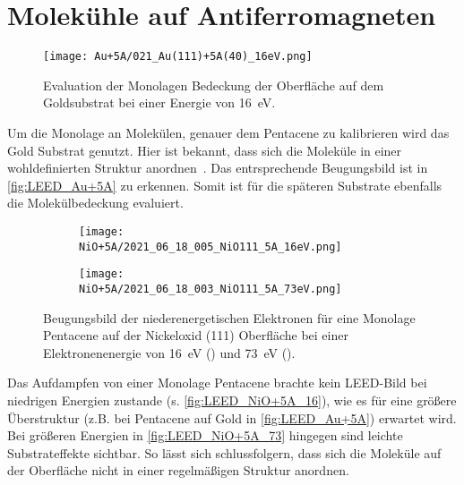     \section{Molekühle auf Antiferromagneten} \label{sec:Ergeb}
        \begin{figure}
            \centering
            \texttt{[image: Au+5A/021\_Au(111)+5A(40)\_16eV.png]}
            \caption{Evaluation der Monolagen Bedeckung der Oberfläche auf dem Goldsubstrat bei einer Energie von \SI{16}{\electronvolt}.}
            \label{fig:LEED_Au+5A}
        \end{figure}
        Um die Monolage an Molekülen, genauer dem Pentacene zu kalibrieren wird das Gold Substrat genutzt.
        Hier ist bekannt, dass sich die Moleküle in einer wohldefinierten Struktur anordnen~\cite{5A_4}.
        Das entrsprechende Beugungsbild ist in \autoref{fig:LEED_Au+5A} zu erkennen.
        Somit ist für die späteren Substrate ebenfalls die Molekülbedeckung evaluiert.

        \begin{figure}
            \centering
            \begin{subfigure}[t]{0.48\textwidth}
                \centering
                \texttt{[image: NiO+5A/2021\_06\_18\_005\_NiO111\_5A\_16eV.png]}
                \subcaption{}
                \label{fig:LEED_NiO+5A_16}
            \end{subfigure}
            \begin{subfigure}[t]{0.48\textwidth}
                \centering
                \texttt{[image: NiO+5A/2021\_06\_18\_003\_NiO111\_5A\_73eV.png]}
                \subcaption{}
                \label{fig:LEED_NiO+5A_73}
            \end{subfigure}
            \caption{Beugungsbild der niederenergetischen Elektronen für eine Monolage Pentacene auf der Nickeloxid (111) Oberfläche bei einer Elektronenenergie von \SI{16}{\electronvolt} () und \SI{73}{\electronvolt} ().}
            \label{fig:LEED_NiO+5A}
        \end{figure}
        Das Aufdampfen von einer Monolage Pentacene brachte kein LEED-Bild bei niedrigen Energien zustande (s. \autoref{fig:LEED_NiO+5A_16}), wie es für eine größere Überstruktur (z.B. bei Pentacene auf Gold in \autoref{fig:LEED_Au+5A}) erwartet wird.
        Bei größeren Energien in \autoref{fig:LEED_NiO+5A_73} hingegen sind leichte Substrateffekte sichtbar.
        So lässt sich schlussfolgern, dass sich die Moleküle auf der Oberfläche nicht in einer regelmäßigen Struktur anordnen.

